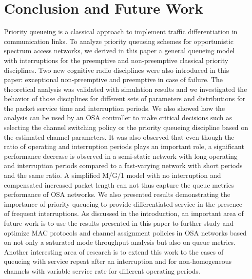 \documentclass[11pt,journal,oneside,onecolumn,draftclsnofoot]{IEEEtran}
\begin{document}
\section{Conclusion and Future Work}
\label{eq:conclusion}
Priority queueing is a classical approach to implement traffic differentiation in communication links. To analyze priority queueing schemes for opportunistic spectrum access networks, we derived in this paper a general queueing model
with interruptions for the preemptive and non-preemptive classical priority
disciplines. Two new cognitive radio disciplines were also introduced in this paper: exceptional non-preemptive and  preemptive in case of failure. The theoretical analysis was validated with simulation results and we investigated the behavior of those disciplines for different sets of parameters and distributions for the packet service time and interruption periods. We also showed how the analysis can be used by an OSA controller to make critical decisions such as selecting the channel switching policy or the priority queueing discipline based on the estimated channel parameters. It was also observed that even though the ratio of operating and interruption periods plays an important role, a significant performance decrease is observed in a semi-static network with long operating and interruption periods compared to a fast-varying network with short periods and the same ratio. A simplified M/G/1 model with no interruption and compensated increased packet length can not thus capture the queue metrics performance of OSA networks. We also presented results demonstrating the importance of priority queueing to provide differentiated service in the presence of frequent interruptions. 
As discussed in the introduction, an important area of future work is to use the results presented in this paper to further study and optimize MAC protocols and channel assignment policies in OSA networks based on not only a saturated mode throughput analysis but also on queue metrics.
Another interesting area of research is to extend this work to the cases of queueing with service repeat after an interruption and for non-homogeneous channels with variable service rate for different operating periods.









\end{document}
